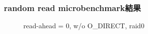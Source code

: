 \documentclass[11pt,a4paper]{jsarticle}
\newlength{\subfigwidth}
\newlength{\subfigcolsep}
\begin{document}
\subsubsection{random read microbenchmark結果}
\begin{figure}[thbp]
 \setlength{\subfigwidth}{.5\linewidth}
 \addtolength{\subfigwidth}{-.5\subfigcolsep}
 \begin{minipage}[b]{\subfigwidth}
 \end{minipage}
  \begin{minipage}[b]{\subfigwidth}
  \end{minipage}
  \caption{read-ahead = 0, w/o O\_DIRECT, raid0}
  \label{fig:md0rand8k0}
\end{figure}
\end{document}
